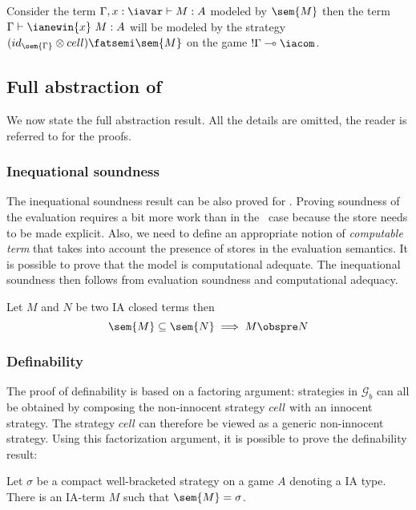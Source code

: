 Consider the term $\Gamma,x:\iavar \vdash M : A$ modeled by
$\sem{M}$ then the term
 $\Gamma \vdash \ianewin{x}\ M : A$  will be modeled by the strategy $(id_{\sem{\Gamma}} \otimes cell) \fatsemi \sem{M}$ on the game
 $!\Gamma \multimap \iacom$.

\subsection{Full abstraction of \ialgol}

We now state the full abstraction result. All the details are
omitted, the reader is referred to
\cite{abramsky:game-semantics-tutorial,AM97a} for the proofs.

\subsubsection{Inequational soundness}

The inequational soundness result can be also proved for \ialgol.
Proving soundness of the evaluation requires a bit more work than in
the \pcf\ case because the store needs to be made explicit. Also, we
need to define an appropriate notion of \emph{computable term} that
takes into account the presence of stores in the evaluation
semantics. It is possible to prove that the model is computational
adequate. The inequational soundness then follows from evaluation
soundness and computational adequacy.


\begin{proposition}
\label{prop:ia_ineqsoundness} Let $M$ and $N$ be two IA closed terms then
$$\sem{M} \subseteq \sem{N} \implies  M \obspre N $$
\end{proposition}

\subsubsection{Definability}

The proof of definability is based on a factoring argument: strategies in
$\mathcal{G}_b$ can all be obtained by composing the non-innocent strategy $cell$ with an innocent strategy.
The strategy $cell$ can therefore be viewed as a generic non-innocent strategy. Using this factorization argument,
it is possible to prove the definability result:
\begin{proposition}[Definability]
\label{prop:ia_definability} Let $\sigma$ be a compact well-bracketed
strategy on a game $A$ denoting a IA type. There is an IA-term $M$ such
that $\sem{M} = \sigma$.
\end{proposition}

